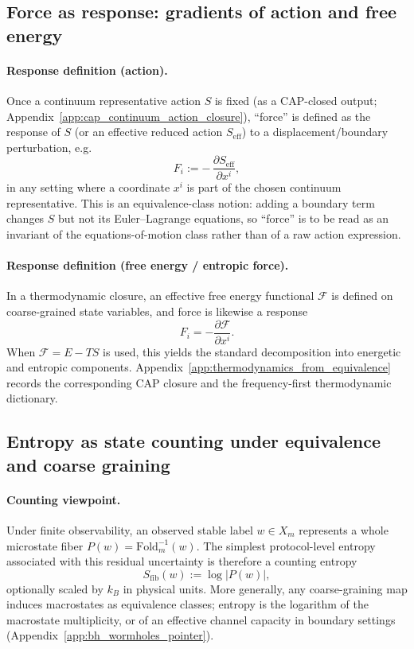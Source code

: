 \subsection{Force as response: gradients of action and free energy}
\label{subsec:force_as_response}

\paragraph{Response definition (action).}
\InterfaceTag Once a continuum representative action $S$ is fixed (as a CAP-closed output; Appendix~\ref{app:cap_continuum_action_closure}),
``force'' is defined as the response of $S$ (or an effective reduced action $S_{\mathrm{eff}}$) to a displacement/boundary perturbation, e.g.
\[
F_i:=-\,\frac{\partial S_{\mathrm{eff}}}{\partial x^i},
\]
in any setting where a coordinate $x^i$ is part of the chosen continuum representative.
This is an equivalence-class notion: adding a boundary term changes $S$ but not its Euler--Lagrange equations, so ``force'' is to be read as an invariant of the equations-of-motion class rather than of a raw action expression.

\paragraph{Response definition (free energy / entropic force).}
\InterfaceTag In a thermodynamic closure, an effective free energy functional $\mathcal{F}$ is defined on coarse-grained state variables, and force is likewise a response
\[
F_i=-\frac{\partial \mathcal{F}}{\partial x^i}.
\]
When $\mathcal{F}=E-TS$ is used, this yields the standard decomposition into energetic and entropic components.
Appendix~\ref{app:thermodynamics_from_equivalence} records the corresponding CAP closure and the frequency-first thermodynamic dictionary.

\subsection{Entropy as state counting under equivalence and coarse graining}
\label{subsec:entropy_state_counting}

\paragraph{Counting viewpoint.}
\InterfaceTag Under finite observability, an observed stable label $w\in X_m$ represents a whole microstate fiber $P(w)=\mathrm{Fold}_m^{-1}(w)$.
The simplest protocol-level entropy associated with this residual uncertainty is therefore a counting entropy
\[
S_{\mathrm{fib}}(w):=\log |P(w)|,
\]
optionally scaled by $k_B$ in physical units.
More generally, any coarse-graining map induces macrostates as equivalence classes; entropy is the logarithm of the macrostate multiplicity, or of an effective channel capacity in boundary settings (Appendix~\ref{app:bh_wormholes_pointer}).

